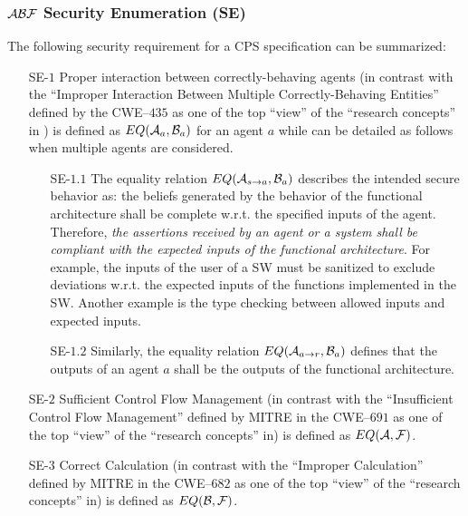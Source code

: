 \subsubsection{$\mathcal{A}\mathcal{B}\mathcal{F}$ Security Enumeration (SE)} The following security requirement for a CPS specification can be summarized:
\begin{enumerate}
	\item[SE-$1$] Proper interaction between correctly-behaving agents (in
		contrast with the ``Improper Interaction Between Multiple
		Correctly-Behaving Entities'' defined by the CWE--$435$ as one of the top ``view'' of the ``research concepts'' in
		\autocite{MITRE2020CWEresearch}) is defined as $EQ(\mathcal{A}_a,\mathcal{B}_a)$ for an agent $a$ while can be detailed as follows when multiple agents are considered.
	\begin{enumerate}
		\item[SE-$1.1$] The equality relation $EQ(\mathcal{A}_{s\rightarrow a},\mathcal{B}_a)$
			describes the intended secure behavior as: the beliefs generated by the behavior of the functional architecture
			shall be complete w.r.t. the specified inputs of the agent. Therefore, \emph{the assertions received by an agent or a system
			shall be compliant with the expected inputs of the functional architecture}. For example, the inputs
			of the user of a SW must be sanitized to exclude deviations w.r.t. the expected inputs of the functions
			implemented in the SW. Another example is the type checking between allowed inputs and expected inputs.
		\item[SE-$1.2$] Similarly, the equality relation $EQ(\mathcal{A}_{a\rightarrow r},\mathcal{B}_a)$ defines that
			the outputs of an agent $a$ shall be the outputs of the functional architecture.
	\end{enumerate}
	\item[SE-$2$]Sufficient Control Flow Management (in contrast with
		the ``Insufficient Control Flow Management'' defined by MITRE
		in the CWE--$691$ as one of the top ``view'' of the ``research
		concepts'' in\autocite{MITRE2020CWEresearch}) is defined as
		$EQ(\mathcal{A},\mathcal{F})$.
	\item[SE-$3$] Correct Calculation (in contrast with the ``Improper
		Calculation'' defined by MITRE in the CWE--$682$ as one of the
		top ``view'' of the ``research concepts''
		in\autocite{MITRE2020CWEresearch}) is defined as
		$EQ(\mathcal{B},\mathcal{F})$.
\end{enumerate}

